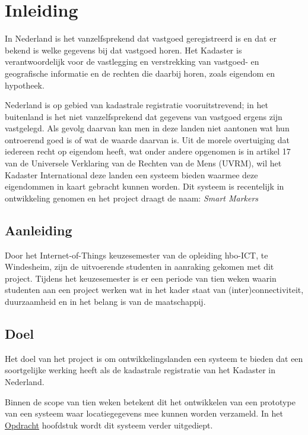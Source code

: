 \section{Inleiding}
\label{sec:inleiding}
In Nederland is het vanzelfsprekend dat vastgoed geregistreerd is en dat er bekend
is welke gegevens bij dat vastgoed horen. Het Kadaster is verantwoordelijk voor de
vastlegging en verstrekking van vastgoed- en geografische informatie en de rechten
die daarbij horen, zoals eigendom en hypotheek.

Nederland is op gebied van kadastrale registratie vooruitstrevend; in het buitenland
is het niet vanzelfsprekend dat gegevens van vastgoed ergens zijn vastgelegd.
Als gevolg daarvan kan men in deze landen niet aantonen wat hun ontroerend goed is 
of wat de waarde daarvan is.
Uit de morele overtuiging dat iedereen recht op eigendom heeft, wat onder andere
opgenomen is in artikel 17 van de Universele Verklaring van de Rechten van
de Mens (UVRM), wil het Kadaster International deze landen een systeem bieden waarmee
deze eigendommen in kaart gebracht kunnen worden. Dit systeem is recentelijk in
ontwikkeling genomen en het project draagt de naam: \textit{Smart Markers}

\subsection{Aanleiding}
Door het Internet-of-Things keuzesemester van de opleiding hbo-ICT, te Windesheim,
zijn de uitvoerende studenten in aanraking gekomen met dit project. Tijdens het
keuzesemester is er een periode van tien weken waarin studenten aan een project
werken wat in het kader staat van (inter)connectiviteit, duurzaamheid en in het
belang is van de maatschappij.

\subsection{Doel}
Het doel van het project is om ontwikkelingslanden een systeem te bieden dat
een soortgelijke werking heeft als de kadastrale registratie van het Kadaster
in Nederland.

Binnen de scope van tien weken betekent dit het ontwikkelen van een prototype
van een systeem waar locatiegegevens mee kunnen worden verzameld. In het
\hyperref[sec:opdracht]{Opdracht} hoofdstuk wordt dit systeem verder uitgediept.
